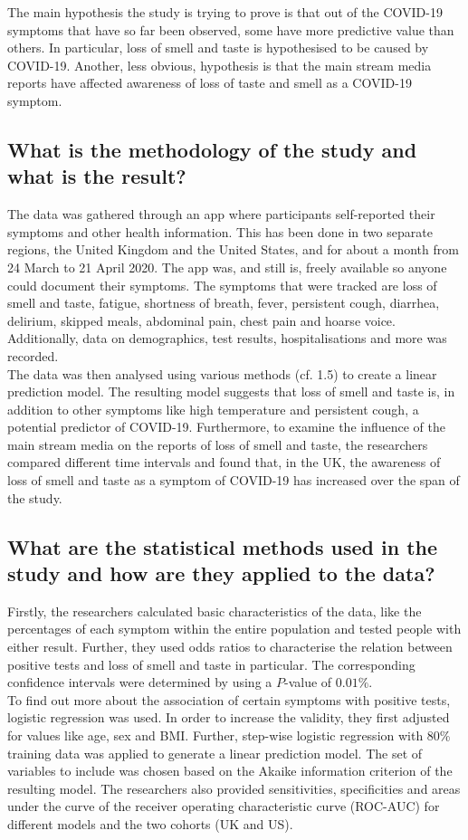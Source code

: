 \documentclass{article}
\begin{document}
The main hypothesis the study is trying to prove is that out of the COVID-19 symptoms that have
so far been observed, some have more predictive value than others. In particular, loss of smell
and taste is hypothesised to be caused by COVID-19. Another, less obvious, hypothesis is
that the main stream media reports have affected awareness of loss of taste and
smell as a COVID-19 symptom.

\subsection{What is the methodology of the study and what is the result?}

The data was gathered through an app where participants self-reported their symptoms and other
health information. This has been done in two separate regions, the United Kingdom and the United
States, and for about a month from 24 March to 21 April 2020.
The app was, and still is, freely available so anyone could document their symptoms.
The symptoms that were tracked are loss of smell
and taste, fatigue, shortness of breath, fever, persistent cough, diarrhea, delirium, skipped meals,
abdominal pain, chest pain and hoarse voice. Additionally, data on demographics,
test results, hospitalisations and more was recorded.\\
\indent The data was then analysed using various methods (cf. 1.5) to create a linear
prediction model. The resulting model suggests that loss of smell and taste is, in
addition to other symptoms like high temperature and persistent cough, a
potential predictor of COVID-19. Furthermore, to examine the influence of the main
stream media on the reports of loss of smell and taste, the researchers compared
different time intervals and found that, in the UK, the awareness of loss of smell
and taste as a symptom of COVID-19 has increased over the span of the study.

\subsection{What are the statistical methods used in the study and how are they applied to the data?}

Firstly, the researchers calculated basic characteristics of the data, like the percentages
of each symptom within the entire population and tested people with either result. Further,
they used odds ratios to characterise the relation between positive tests and loss of
smell and taste in particular. The corresponding confidence intervals were determined by
using a $P$-value of $0.01\%$.\\
\indent To find out more about the association of certain symptoms with positive tests, logistic
regression was used. In order to increase the validity,
they first adjusted for values like age, sex and BMI. Further, step-wise logistic regression
with 80\% training data was applied to generate 
a linear prediction model. The set of variables to include was
chosen based on the Akaike information criterion of the resulting model. The researchers also
provided sensitivities, specificities and areas under the curve of the receiver operating
characteristic curve (ROC-AUC) for different models and the two cohorts (UK and US).
\end{document}
